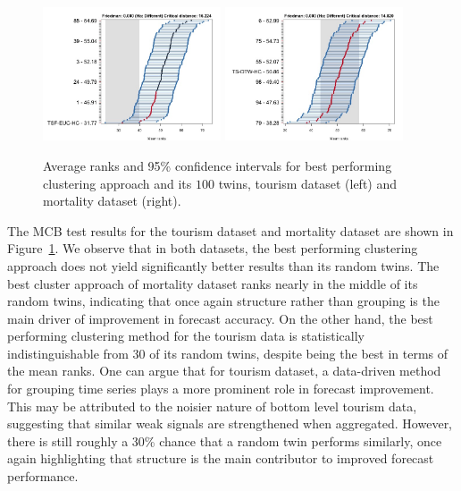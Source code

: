 \documentclass[a4paper,review,12pt,authoryear]{elsarticle}
\begin{document}
\begin{figure}[h!]
    \centering
    \includegraphics[width=0.47\textwidth]{../figures/Figure7_tourism_cluster_vs_pc.jpg}
    \includegraphics[width=0.47\textwidth]{../figures/Figure7_mortality_cluster_vs_pc.jpg}
    \caption{\label{fig:P3_tourism_c_vs_pc}Average ranks and 95\% confidence intervals for best performing clustering approach and its $100$ twins, tourism dataset (left) and mortality dataset (right).}
\end{figure}


The MCB test results for the tourism dataset and mortality dataset are shown in Figure~\ref{fig:P3_tourism_c_vs_pc}.
We observe that in both datasets, the best performing clustering approach does not yield significantly better results than its random twins. 
The best cluster approach of mortality dataset ranks nearly in the middle of its random twins, indicating that once again structure rather than grouping is the main driver of improvement in forecast accuracy. 
On the other hand, the best performing clustering method for the tourism data is statistically indistinguishable from 30 of its random twins, despite being the best in terms of the mean ranks. One can argue that for tourism dataset, a data-driven method for grouping time series plays a more prominent role in forecast improvement. 
This may be attributed to the noisier nature of bottom level tourism data, suggesting that similar weak signals are strengthened when aggregated.
However, there is still roughly a 30\% chance that a random twin performs similarly, once again highlighting that structure is the main contributor to improved forecast performance.
\end{document}
